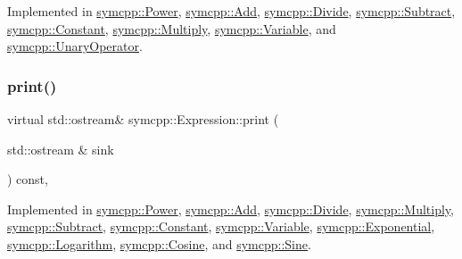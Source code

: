 Implemented in \mbox{\hyperlink{classsymcpp_1_1Power_a1287f36d506b82695187beae3f3c9a5e}{symcpp\+::\+Power}}, \mbox{\hyperlink{classsymcpp_1_1Add_aec3ebe2c1bde461d8bd086e9c87aeeed}{symcpp\+::\+Add}}, \mbox{\hyperlink{classsymcpp_1_1Divide_a016fec0e409cff8d0cd2b53eea1fa6c3}{symcpp\+::\+Divide}}, \mbox{\hyperlink{classsymcpp_1_1Subtract_ac0b20c29aac75772aeb226eec86ffc22}{symcpp\+::\+Subtract}}, \mbox{\hyperlink{classsymcpp_1_1Constant_a8c5e1e1b0cb2131d6f20b118f32a223f}{symcpp\+::\+Constant}}, \mbox{\hyperlink{classsymcpp_1_1Multiply_afd9f779b82aa2d7a3be63e7b8b0e8eb1}{symcpp\+::\+Multiply}}, \mbox{\hyperlink{classsymcpp_1_1Variable_a4b998019a17f29482772f1f945398ff3}{symcpp\+::\+Variable}}, and \mbox{\hyperlink{classsymcpp_1_1UnaryOperator_a129a9c47390abceff31da35d7b847329}{symcpp\+::\+Unary\+Operator}}.

\mbox{\label{classsymcpp_1_1Expression_af37e13032a40f2da4d2866eaa8658049}} 
\subsubsection{\texorpdfstring{print()}{print()}}
{\footnotesize\ttfamily virtual std\+::ostream\& symcpp\+::\+Expression\+::print (\begin{DoxyParamCaption}\item[{std\+::ostream \&}]{sink }\end{DoxyParamCaption}) const\hspace{0.3cm}{\ttfamily [private]}, {}}



Implemented in \mbox{\hyperlink{classsymcpp_1_1Power_aeddeec10b104818656e7f2f1536abccc}{symcpp\+::\+Power}}, \mbox{\hyperlink{classsymcpp_1_1Add_a4e73df4d72972d00ab139c5db4a93a0b}{symcpp\+::\+Add}}, \mbox{\hyperlink{classsymcpp_1_1Divide_a113a96148c27f2d50a596c782f9a4005}{symcpp\+::\+Divide}}, \mbox{\hyperlink{classsymcpp_1_1Multiply_a8d6dbfc85d0609f40d52c0fc853a06b5}{symcpp\+::\+Multiply}}, \mbox{\hyperlink{classsymcpp_1_1Subtract_a7f0af9519d3a4978abf85e88da7d682d}{symcpp\+::\+Subtract}}, \mbox{\hyperlink{classsymcpp_1_1Constant_aca89e2af8df740dba562776e389edab6}{symcpp\+::\+Constant}}, \mbox{\hyperlink{classsymcpp_1_1Variable_a10ce030c1648fae51534712155ffcab1}{symcpp\+::\+Variable}}, \mbox{\hyperlink{classsymcpp_1_1Exponential_a2af4d6f507139799516d960293f74343}{symcpp\+::\+Exponential}}, \mbox{\hyperlink{classsymcpp_1_1Logarithm_a336bed1a474b338eabd6a258d527b65b}{symcpp\+::\+Logarithm}}, \mbox{\hyperlink{classsymcpp_1_1Cosine_a2d8d4dc8d5119d59365f212b7d855a53}{symcpp\+::\+Cosine}}, and \mbox{\hyperlink{classsymcpp_1_1Sine_ad3680056460c4990115a23427ea723fe}{symcpp\+::\+Sine}}.

